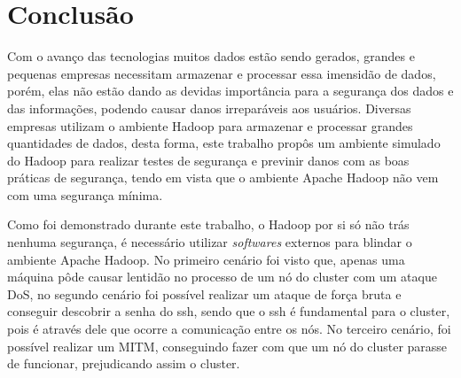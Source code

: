 \chapter{Conclusão}
\label{CAP6}

\begin{comment}
Com o avanço das tecnologias muitos dados estão sendo gerados, grandes e pequenas empresas necessitam armazenar e processar essa imensidão de dados, porém, elas não estão dando as devidas importância para a segurança dos dados e das informações, podendo causar danos irreparáveis aos usuários.

Diversas empresas utilizam o ambiente hadoop para armazenar e processar grandes quantidades de dados, desta forma, este trabalho propos um ambiente simulado do hadoop para realizar testes de segurança e previnir danos com as boas praticas de segurança.

O ambiente criado proporciona ao desenvolvedor uma visão na qual ele ira poder realizar testes automatizados. Ele será capaz de testar a segurança do ambiente e prever falhas futuras. Este trabalho possui suas limitações quanto ao ambiente, tendo em vista que a máquina principal não possui um hardware excelente para o desenvolvimento de um cluster maior, mas as limitações foram controladas devido a simplificação na memoria disponivel ao cluster.
\end{comment}


Com o avanço das tecnologias muitos dados estão sendo gerados, grandes e pequenas empresas necessitam armazenar e processar essa imensidão de dados, porém, elas não estão dando as devidas importância para a segurança dos dados e das informações, podendo causar danos irreparáveis aos usuários. Diversas empresas utilizam o ambiente Hadoop para armazenar e processar grandes quantidades de dados, desta forma, este trabalho propôs um ambiente simulado do Hadoop para realizar testes de segurança e previnir danos com as boas práticas de segurança, tendo em vista que o ambiente Apache Hadoop não vem com uma segurança mínima.

Como foi demonstrado durante este trabalho, o Hadoop por si só não trás nenhuma segurança, é necessário utilizar \textit{softwares} externos para blindar o ambiente Apache Hadoop. No primeiro cenário foi visto que, apenas uma máquina pôde causar lentidão no processo de um nó do cluster com um ataque DoS, no segundo cenário foi possível realizar um ataque de força bruta e conseguir descobrir a senha do ssh, sendo que o ssh é fundamental para o cluster, pois é através dele que ocorre a comunicação entre os nós. No terceiro cenário, foi possível realizar um MITM, conseguindo fazer com que um nó do cluster parasse de funcionar, prejudicando assim o cluster.

